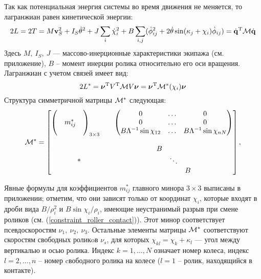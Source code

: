Так как потенциальная энергия системы во время движения не меняется, то лагранжиан  равен кинетической энергии:
\begin{equation}\label{kin_en}
    2L = 2T = M\boldsymbol{\mathbf{v}}_S^2 + I_S\dot{\theta}^2 + J\sum_i\dot{\chi}_i^2 + B\sum_{i,j}(\dot{\phi}_{ij}^2 + 2\dot{\theta}\sin(\kappa_j + \chi_i)\dot{\phi}_{ij})=\dot{\boldsymbol{\mathbf{q}}}^\mathrm{T}\mathcal{M}\dot{\boldsymbol{\mathbf{q}}}
\end{equation}
Здесь $M,\ I_S,\ J$ --- массово-инерционные характеристики экипажа (см. приложение), $B$ -- момент инерции ролика относительно его оси вращения. Лагранжиан с учетом связей имеет вид:
$$ 2L^{*}  = \boldsymbol{\mathbf{\nu}}^\mathrm{T} V^\mathrm{T}\mathcal{M} V\boldsymbol{\mathbf{\nu}} = \boldsymbol{\mathbf{\nu}}^\mathrm{T} \mathcal{M}^*(\chi_i)\boldsymbol{\mathbf{\nu}} $$
Структура симметричной матрицы $\mathcal{M}^*$ следующая:
$$
\mathcal{M}^* = \begin{bmatrix}
        \left(\begin{matrix}&&\\&m^*_{ij}&\\&&\end{matrix}\right)_{3\times3} \quad & \left(\begin{matrix} 0&\ldots& 0 \\ 0&\ldots&0 \\ B\Lambda^{-1}\sin\chi_{12}&\ldots& B\Lambda^{-1}\sin\chi_{nN} \end{matrix}\right) \\[25pt]
        *          & \begin{matrix} B & & \\ & \ddots & \\ & & B \end{matrix} \\
    \end{bmatrix},
$$

Явные формулы для коэффициентов $m^*_{ij}$ главного минора $3\times3$ выписаны в приложении; отметим, что они зависят только от координат $\chi_i$, которые входят в дроби вида $B/\rho_i^2$ и $B\sin\chi_i/\rho_i$, имеющие неустранимый разрыв при смене роликов (см. (\ref{constraint_roller_contact})). Этот минор соответствует псевдоскоростям $\nu_1,\ \nu_2,\ \nu_3$. Остальные элементы матрицы $\mathcal{M}^*$
соответствуют скоростям свободных роликoв $\nu_s$, для которых $\chi_{kl} = \chi_k+\kappa_l$ --- угол между вертикалью и осью ролика. Индекс $k = 1,\dots,N$ означает номер колеса, индекс $l = 2,\ldots, n$ -- номер cвободного ролика на колесе ($l = 1$ -- ролик, находящийся в контакте). 

